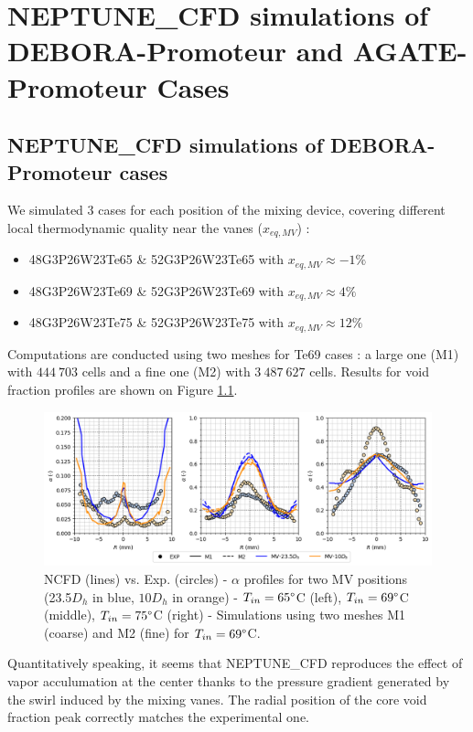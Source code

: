 \chapter{NEPTUNE\_CFD simulations of DEBORA-Promoteur and AGATE-Promoteur Cases}


\section{NEPTUNE\_CFD simulations of DEBORA-Promoteur cases}

We simulated 3 cases for each position of the mixing device, covering different local thermodynamic quality near the vanes ($x_{eq,MV}$) :

\begin{itemize}
\item 48G3P26W23Te65 \& 52G3P26W23Te65 with $x_{eq,MV}\approx -1\%$ 
\item 48G3P26W23Te69 \& 52G3P26W23Te69 with $x_{eq,MV}\approx 4\%$ 
\item 48G3P26W23Te75 \& 52G3P26W23Te75 with $x_{eq,MV}\approx 12\%$ 
\end{itemize}

Computations are conducted using two meshes for Te69 cases : a large one (M1) with $444~703$ cells and a fine one (M2) with $3~487~627$ cells. Results for void fraction profiles are shown on Figure \ref{fig:sim_prom}.


%
\begin{figure}[!htb]
\centering
\includegraphics[scale=0.60]{img/DEBORA-Promoteur/alpha_prom.png}
\caption{NCFD (lines) vs. Exp. (circles) - $\alpha$ profiles for two MV positions (23.5$D_{h}$ in blue, $10D_{h}$ in orange) - $T_{in}=65\degree$C (left), $T_{in}=69\degree$C (middle), $T_{in}=75\degree$C (right) - Simulations using two meshes M1 (coarse) and M2 (fine) for $T_{in}=69\degree$C.}
\label{fig:sim_prom}
\end{figure}
%


Quantitatively speaking, it seems that NEPTUNE\_CFD reproduces the effect of vapor acculumation at the center thanks to the pressure gradient generated by the swirl induced by the mixing vanes. The radial position  of the core void fraction peak correctly matches the experimental one. 

